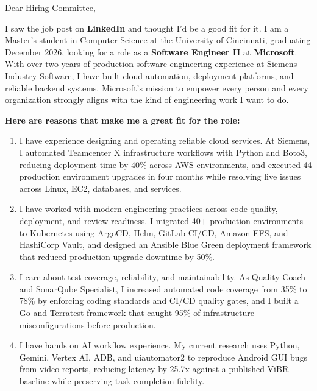 \documentclass[11pt]{letter}
\date{}
\begin{document}
\begin{letter}{}

\opening{Dear Hiring Committee,}

I saw the job post on \textbf{LinkedIn} and thought I'd be a good fit for it. I am a Master's student in Computer Science at the University of Cincinnati, graduating December 2026, looking for a role as a \textbf{Software Engineer II} at \textbf{Microsoft}. With over two years of production software engineering experience at Siemens Industry Software, I have built cloud automation, deployment platforms, and reliable backend systems. Microsoft's mission to empower every person and every organization strongly aligns with the kind of engineering work I want to do.

\textbf{Here are reasons that make me a great fit for the role:}

\begin{enumerate}[leftmargin=*, itemsep=0.45em]
    \item I have experience designing and operating reliable cloud services. At Siemens, I automated Teamcenter X infrastructure workflows with Python and Boto3, reducing deployment time by 40\% across AWS environments, and executed 44 production environment upgrades in four months while resolving live issues across Linux, EC2, databases, and services.

    \item I have worked with modern engineering practices across code quality, deployment, and review readiness. I migrated 40+ production environments to Kubernetes using ArgoCD, Helm, GitLab CI/CD, Amazon EFS, and HashiCorp Vault, and designed an Ansible Blue Green deployment framework that reduced production upgrade downtime by 50\%.

    \item I care about test coverage, reliability, and maintainability. As Quality Coach and SonarQube Specialist, I increased automated code coverage from 35\% to 78\% by enforcing coding standards and CI/CD quality gates, and I built a Go and Terratest framework that caught 95\% of infrastructure misconfigurations before production.

    \item I have hands on AI workflow experience. My current research uses Python, Gemini, Vertex AI, ADB, and uiautomator2 to reproduce Android GUI bugs from video reports, reducing latency by 25.7x against a published ViBR baseline while preserving task completion fidelity.
\end{enumerate}


\end{letter}
\end{document}
